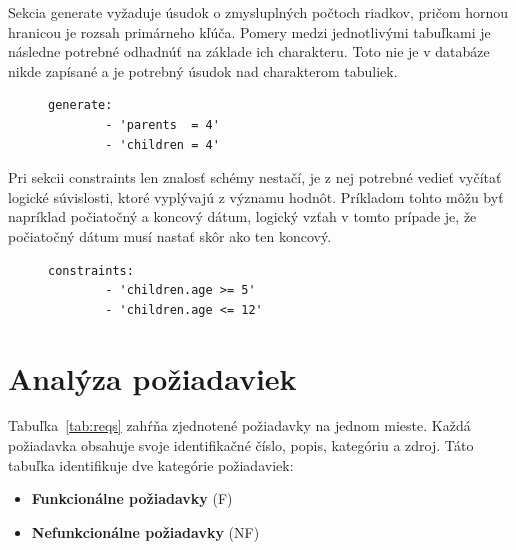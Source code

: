 Sekcia generate vyžaduje úsudok o zmysluplných počtoch riadkov, pričom hornou hranicou je rozsah primárneho kľúča. Pomery medzi jednotlivými tabuľkami je následne potrebné odhadnúť na základe ich charakteru. Toto nie je v databáze nikde zapísané a je potrebný úsudok nad charakterom tabuliek.



\begin{figure}[H]
    \centering
    \begin{lstlisting}[caption={Generate sekcia pre ukážkovú databázu.}, frame=single, linewidth=0.75\textwidth, xleftmargin=0.260\textwidth, label={lst:recipe-generate}]
    generate:
        - 'parents  = 4'
        - 'children = 4'
    \end{lstlisting}

\end{figure}

Pri sekcii constraints len znalosť schémy nestačí, je z nej potrebné vedieť vyčítať logické súvislosti, ktoré vyplývajú z významu hodnôt. Príkladom tohto môžu byť napríklad počiatočný a koncový dátum, logický vzťah v tomto prípade je, že počiatočný dátum musí nastať skôr ako ten koncový.



\begin{figure}[H]
    \centering
    \begin{lstlisting}[caption={Constraints sekcia pre ukážkovú databázu.}, frame=single, linewidth=0.75\textwidth, xleftmargin=0.260\textwidth, label={lst:recipe-constraints}]
    constraints:
        - 'children.age >= 5'
        - 'children.age <= 12'
    \end{lstlisting}

\end{figure}


\section{Analýza požiadaviek}

\label{sub:analyza_poziadaviek}

Tabuľka~\ref{tab:reqs} zahŕňa zjednotené požiadavky na jednom mieste. Každá požiadavka obsahuje svoje identifikačné číslo, popis, kategóriu a zdroj. Táto tabuľka identifikuje dve kategórie požiadaviek:
\begin{itemize}
    \item \textbf{Funkcionálne požiadavky} (F)
    \item \textbf{Nefunkcionálne požiadavky} (NF)
\end{itemize}

